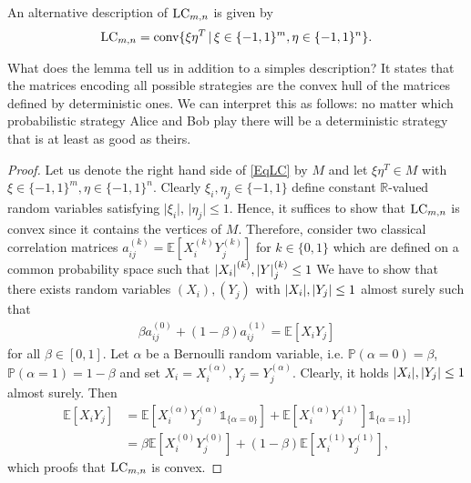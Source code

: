 \begin{lemma}\label{LemLC}
	An alternative description of $ \textup{LC}_{m,n} $ is given by 
	\begin{align}\label{EqLC}
		\textup{LC}_{m,n} = \textup{conv} \{  \xi\eta^T \, | \, \xi \in \{-1,1\}^m, \eta \in \{-1,1\}^n     \}.
	\end{align}
\end{lemma}
What does the lemma tell us in addition to a simples description? It states that the matrices encoding all possible strategies are the convex hull of the matrices defined by deterministic ones. We can interpret this as follows: no matter which probabilistic strategy Alice and Bob play there will be a deterministic strategy that is at least as good as theirs. 
\begin{proof}
	Let us denote the right hand side of \ref{EqLC} by $ M $ and let $ \xi\eta^T \in M $ with $ \xi \in \{-1,1\}^m, \eta \in \{-1,1\}^n $. Clearly $ \xi_i, \eta_j \in \{-1,1\} $ define constant $ \mathbb{R} $-valued random variables satisfying $ \vert \xi_i \vert, \, \vert \eta_j \vert \le 1 $. Hence, it suffices to show that $ \textup{LC}_{m,n} $ is convex since it contains the vertices of $ M $. Therefore, consider two classical correlation matrices $ a_{ij}^{(k)} = \mathbb{E}[X_i^{(k)}Y_{j}^{(k)}] $ for $ k \in \{0,1\} $ which are defined on a common probability space such that $ {\left|{X_i}\right|}^{(k)},{\left|{Y}\right|}_j^{(k)} \le 1 $ We have to show that there exists random variables $ (X_i),(Y_j) $ with $ {\left|{X_i}\right|},{\left|{Y_j}\right|} \le 1 $ almost surely such that
	\begin{align}
		\beta a_{ij}^{(0)}+ (1-\beta)a_{ij}^{(1)} = \mathbb{E}[X_iY_j]
	\end{align}
	for all $ \beta \in [0,1] $.
	Let $ \alpha $ be a Bernoulli random variable, i.e. $ \mathbb{P}(\alpha = 0) = \beta $, $ \mathbb{P}(\alpha = 1) = 1 - \beta$ and set $ X_i = X_i^{(\alpha)}, Y_j = Y_j^{(\alpha)} $.
	Clearly, it holds $ {\left|{X_i}\right|}, {\left|{Y_j}\right|} \le 1 $ almost surely. 
	Then 
	\begin{align*}
		\mathbb{E}[X_iY_j] &= \mathbb{E}[X_i^{(\alpha)}Y_j^{(\alpha)}  \mathds{1}_{ \{\alpha = 0\}}] + \mathbb{E}[X_i^{(\alpha)}Y_j^{(1)}]\mathds{1}_{\{\alpha = 1\}}] \\
		&= \beta \mathbb{E}[X_i^{(0)}Y_j^{(0)} ] + (1-\beta) \mathbb{E}[X_i^{(1)}Y_j^{(1)}],
	\end{align*} 
	which proofs that $ \textup{LC}_{m,n} $ is convex.
	
	
	

\end{proof}
